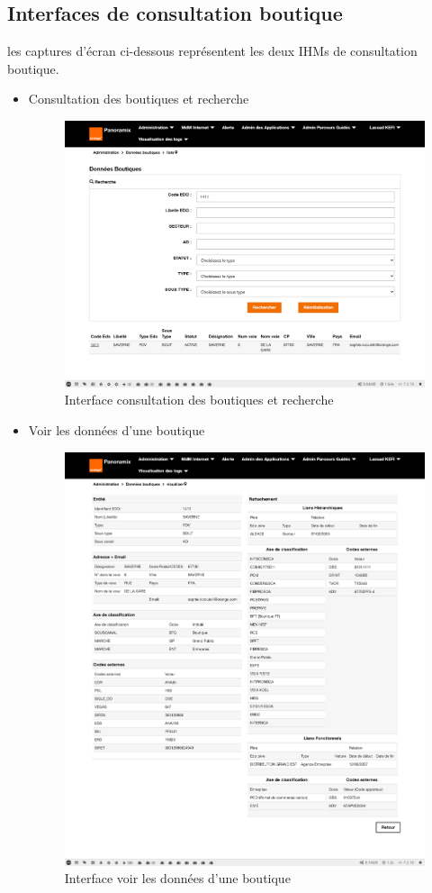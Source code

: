 \subsection{Interfaces de consultation boutique}
les captures d'écran ci-dessous représentent les deux IHMs de consultation boutique.
\begin{itemize}
	\item Consultation des boutiques et recherche
	\begin{figure}[H]
		\centering
		\includegraphics[width=0.5\linewidth]{img/screenshots/boutique/index}
		\caption[Interface consultation des boutiques et recherche]{Interface consultation des boutiques et recherche}
		\label{fig:index-btq}
	\end{figure}
	
	\item Voir les données d'une boutique
	\begin{figure}[H]
		\centering
		\includegraphics[width=0.5\linewidth]{img/screenshots/boutique/view}
		\caption[Interfacevoir les données d'une boutique]{Interface voir les données d'une boutique}
		\label{fig:view-btq}
	\end{figure}
\end{itemize}

